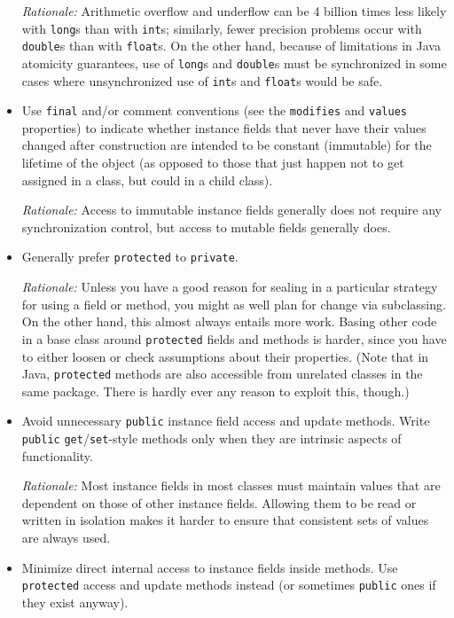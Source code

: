 \begin{itemize}
    \emph{Rationale:} Arithmetic overflow and underflow can be 4 billion times less likely with \texttt{long}s than with \texttt{int}s; similarly, fewer precision problems occur with \texttt{double}s than with \texttt{float}s. On the other hand, because of limitations in Java atomicity guarantees, use of \texttt{long}s and \texttt{double}s must be synchronized in some cases where unsynchronized use of \texttt{int}s and \texttt{float}s would be safe.

    \item
    Use \texttt{final} and/or comment conventions (see the \texttt{modifies} and \texttt{values} properties) to indicate whether instance fields that never have their values changed after construction are intended to be constant (immutable) for the lifetime of the object (as opposed to those that just happen not to get assigned in a class, but could in a child class).

    \emph{Rationale:} Access to immutable instance fields generally does not require any synchronization control, but access to mutable fields generally does.

    \item 
    Generally prefer \texttt{protected} to \texttt{private}.

    \emph{Rationale:} Unless you have a good reason for sealing in a particular strategy for using a field or method, you might as well plan for change via subclassing. On the other hand, this almost always entails more work. Basing other code in a base class around \texttt{protected} fields and methods is harder, since you have to either loosen or check assumptions about their properties. (Note that in Java, \texttt{protected} methods are also accessible from unrelated classes in the same package. There is hardly ever any reason to exploit this, though.)

    \item 
    Avoid unnecessary \texttt{public} instance field access and update methods. Write \texttt{public} \texttt{get}/\texttt{set}-style methods only when they are intrinsic aspects of functionality.

    \emph{Rationale:} Most instance fields in most classes must maintain values that are dependent on those of other instance fields. Allowing them to be read or written in isolation makes it harder to ensure that consistent sets of values are always used.

    \item 
    Minimize direct internal access to instance fields inside methods. Use \texttt{protected} access and update methods instead (or sometimes \texttt{public} ones if they exist anyway).


\end{itemize}
